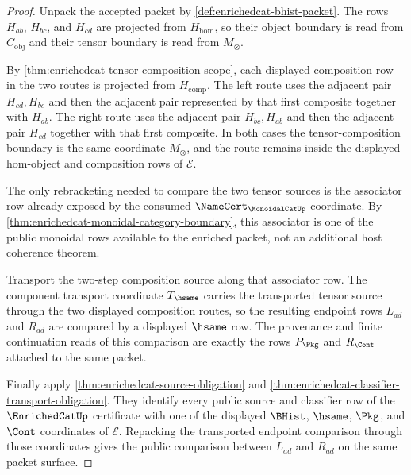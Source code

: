 \begin{proof}
Unpack the accepted packet by \autoref{def:enrichedcat-bhist-packet}. The rows $H_{ab}$, $H_{bc}$, and $H_{cd}$ are projected from $H_{\mathrm{hom}}$, so their object boundary is read from $C_{\mathrm{obj}}$ and their tensor boundary is read from $M_{\otimes}$.

By \autoref{thm:enrichedcat-tensor-composition-scope}, each displayed composition row in the two routes is projected from $H_{\mathrm{comp}}$. The left route uses the adjacent pair $H_{cd},H_{bc}$ and then the adjacent pair represented by that first composite together with $H_{ab}$. The right route uses the adjacent pair $H_{bc},H_{ab}$ and then the adjacent pair $H_{cd}$ together with that first composite. In both cases the tensor-composition boundary is the same coordinate $M_{\otimes}$, and the route remains inside the displayed hom-object and composition rows of $\mathcal{E}$.

The only rebracketing needed to compare the two tensor sources is the associator row already exposed by the consumed $\NameCert_{\MonoidalCatUp}$ coordinate. By \autoref{thm:enrichedcat-monoidal-category-boundary}, this associator is one of the public monoidal rows available to the enriched packet, not an additional host coherence theorem.

Transport the two-step composition source along that associator row. The component transport coordinate $T_{\hsame}$ carries the transported tensor source through the two displayed composition routes, so the resulting endpoint rows $L_{ad}$ and $R_{ad}$ are compared by a displayed $\hsame$ row. The provenance and finite continuation reads of this comparison are exactly the rows $P_{\Pkg}$ and $R_{\Cont}$ attached to the same packet.

Finally apply \autoref{thm:enrichedcat-source-obligation} and \autoref{thm:enrichedcat-classifier-transport-obligation}. They identify every public source and classifier row of the $\EnrichedCatUp$ certificate with one of the displayed $\BHist$, $\hsame$, $\Pkg$, and $\Cont$ coordinates of $\mathcal{E}$. Repacking the transported endpoint comparison through those coordinates gives the public comparison between $L_{ad}$ and $R_{ad}$ on the same packet surface.
\end{proof}

